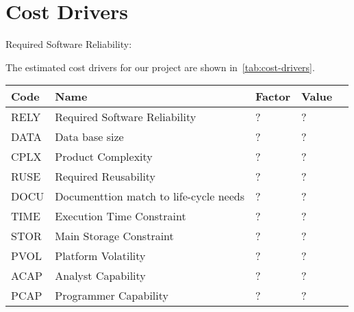 \section{Cost Drivers}

\begin{description}

    \item[Required Software Reliability:]
\end{description}

The estimated cost drivers for our project are shown in~\autoref{tab:cost-drivers}.

\begin{table}[h]
    \centering
    \begin{tabular}{| l | l | l | l | l |}
        \hline
        \textbf{Code}   & \textbf{Name}                             & \textbf{Factor}   & \textbf{Value}    \\
        \hline
        RELY            & Required Software Reliability             & ?                 & ?                 \\
        \hline
        DATA            & Data base size                            & ?                 & ?                 \\
        \hline
        CPLX            & Product Complexity                        & ?                 & ?                 \\
        \hline
        RUSE            & Required Reusability                      & ?                 & ?                 \\
        \hline
        DOCU            & Documenttion match to life-cycle needs    & ?                 & ?                 \\
        \hline
        TIME            & Execution Time Constraint                 & ?                 & ?                 \\
        \hline
        STOR            & Main Storage Constraint                   & ?                 & ?                 \\
        \hline
        PVOL            & Platform Volatility                       & ?                 & ?                 \\
        \hline
        ACAP            & Analyst Capability                        & ?                 & ?                 \\
        \hline
        PCAP            & Programmer Capability                     & ?                 & ?                 \\

\end{tabular}
\end{table}
